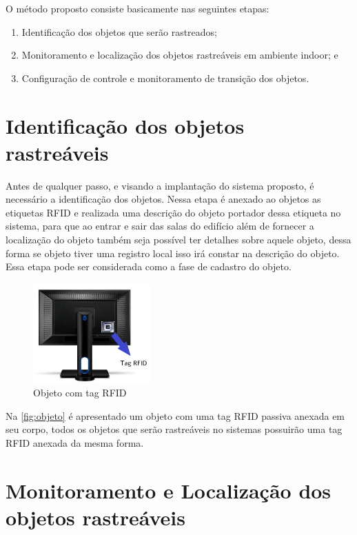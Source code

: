 \par
O método proposto consiste basicamente nas seguintes etapas:
\begin{enumerate}
    \item Identificação dos objetos que serão rastreados;
    \item Monitoramento e localização dos objetos rastreáveis em ambiente indoor; e
    \item Configuração de controle e monitoramento de transição dos objetos.
\end{enumerate}

%
%
\section{Identificação dos objetos rastreáveis}

Antes de qualquer passo, e visando a implantação do sistema proposto, é necessário a identificação dos objetos.
Nessa etapa é anexado ao objetos as etiquetas RFID e realizada uma descrição do objeto portador dessa etiqueta
no sistema, para que ao entrar e sair das salas do edifício além de fornecer a localização do objeto também seja
possível ter detalhes sobre aquele objeto, dessa forma se objeto tiver uma registro local isso irá constar na
descrição do objeto. Essa etapa pode ser considerada como a fase de cadastro do objeto.

\begin{figure}[H]
              \caption{\label{fig:objeto}{Objeto com tag RFID}}
              \centering
              \includegraphics[width=0.4\textwidth]{Figuras/monitor.png}
\end{figure}
\par
Na \autoref{fig:objeto} é apresentado um objeto com uma tag RFID passiva anexada em seu corpo, todos os objetos que serão rastreáveis no sistemas possuirão uma tag RFID anexada da mesma forma.

%
\section{Monitoramento e Localização dos objetos rastreáveis}

